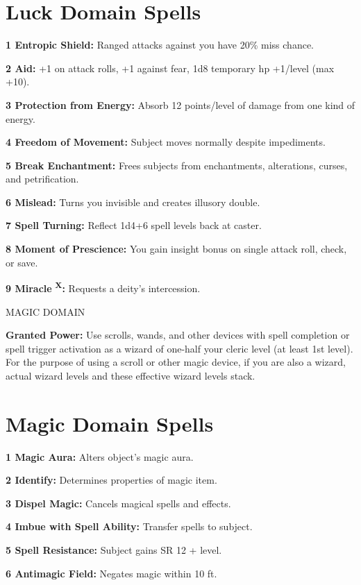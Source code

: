 \documentclass{article}
\begin{document}
\section*{\textbf{Luck Domain Spells}}

\textbf{1 Entropic Shield: }Ranged attacks against you have 20\% miss chance.

\textbf{2 Aid: }+1 on attack rolls, +1 against fear, 1d8 temporary hp +1/level 
(max +10).

\textbf{3 Protection from Energy: }Absorb 12 points/level of damage from one kind 
of energy.

\textbf{4 Freedom of Movement:} Subject moves normally despite impediments.

\textbf{5 Break Enchantment: }Frees subjects from enchantments, alterations, curses, 
and petrification.

\textbf{6 Mislead:} Turns you invisible and creates illusory double.

\textbf{7 Spell Turning: }Reflect 1d4+6 spell levels back at caster.

\textbf{8 Moment of Prescience: }You gain insight bonus on single attack roll, 
check, or save.

\textbf{9 Miracle }\textsuperscript{\textbf{X}}\textbf{: }Requests a deity's intercession.

\vspace{12pt}
MAGIC DOMAIN

\textbf{Granted Power:} Use scrolls, wands, and other devices with spell completion 
or spell trigger activation as a wizard of one-half your cleric level (at least 
1st level). For the purpose of using a scroll or other magic device, if you are 
also a wizard, actual wizard levels and these effective wizard levels stack.

\section*{\textbf{Magic Domain Spells}}

\textbf{1 Magic Aura: }Alters object's magic aura.

\textbf{2 Identify: }Determines properties of magic item.

\textbf{3 Dispel Magic: }Cancels magical spells and effects.

\textbf{4 Imbue with Spell Ability: }Transfer spells to subject.

\textbf{5 Spell Resistance:} Subject gains SR 12 + level.

\textbf{6 Antimagic Field: }Negates magic within 10 ft.
\end{document}
